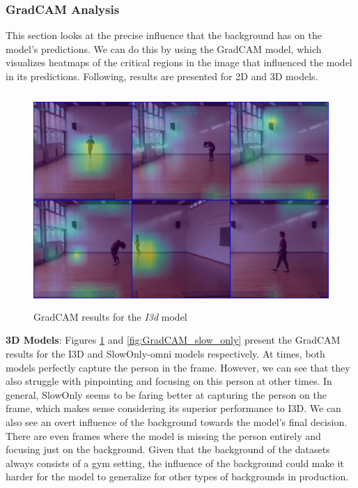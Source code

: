 \documentclass[extern,palatino]{cgMA}
\begin{document}
\subsubsection{GradCAM Analysis}
\label{research_question_5_2}

This section looks at the precise influence that the background has on the model's predictions. We can do this by using the GradCAM model, which visualizes heatmaps of the critical regions in the image that influenced the model in its predictions. Following, results are presented for 2D and 3D models.

\begin{figure}[h]
\center
\includegraphics[height={230pt}, width={370pt}]{Thesis/images/GradCAM_i3d.jpg}
\caption{GradCAM results for the \textit{I3d} model}
\label{fig:GradCAM_i3d}
\end{figure}

\bigskip
\noindent\textbf{3D Models}: Figures \ref{fig:GradCAM_i3d} and \ref{fig:GradCAM_slow_only} present the GradCAM results for the I3D and SlowOnly-omni models respectively. At times, both models perfectly capture the person in the frame. However, we can see that they also struggle with pinpointing and focusing on this person at other times. In general, SlowOnly seems to be faring better at capturing the person on the frame, which makes sense considering its superior performance to I3D. We can also see an overt influence of the background towards the model's final decision. There are even frames where the model is missing the person entirely and focusing just on the background. Given that the background of the datasets always consists of a gym setting, the influence of the background could make it harder for the model to generalize for other types of backgrounds in production.
\end{document}

